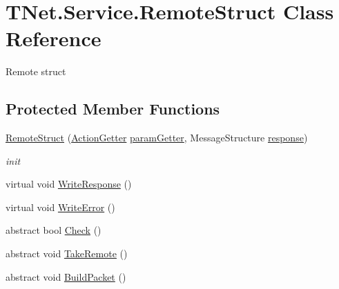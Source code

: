 \hypertarget{class_t_net_1_1_service_1_1_remote_struct}{}\section{T\+Net.\+Service.\+Remote\+Struct Class Reference}
\label{class_t_net_1_1_service_1_1_remote_struct}


Remote struct  


\subsection*{Protected Member Functions}
\begin{DoxyCompactItemize}
\item 
\mbox{\hyperlink{class_t_net_1_1_service_1_1_remote_struct_a8a7dc68ea6f1c71c7c59c099c981fede}{Remote\+Struct}} (\mbox{\hyperlink{class_t_net_1_1_service_1_1_action_getter}{Action\+Getter}} \mbox{\hyperlink{class_t_net_1_1_service_1_1_remote_struct_aa28ecde1dab94de21f6da421afbafc4c}{param\+Getter}}, Message\+Structure \mbox{\hyperlink{class_t_net_1_1_service_1_1_remote_struct_a1759bb0f1f894a8bcd48d8277330d57e}{response}})
\begin{DoxyCompactList}\small\item\em init \end{DoxyCompactList}\item 
virtual void \mbox{\hyperlink{class_t_net_1_1_service_1_1_remote_struct_ad7a02002079c9d56c4f8fa3dbc16b023}{Write\+Response}} ()
\item 
virtual void \mbox{\hyperlink{class_t_net_1_1_service_1_1_remote_struct_ab9233749a42d8131f7024a08ddb9a352}{Write\+Error}} ()
\item 
abstract bool \mbox{\hyperlink{class_t_net_1_1_service_1_1_remote_struct_a928f5ff2f97d1ec5ad88160befa91941}{Check}} ()
\item 
abstract void \mbox{\hyperlink{class_t_net_1_1_service_1_1_remote_struct_afa351a99bae78b432260517bc78401dc}{Take\+Remote}} ()
\item 
abstract void \mbox{\hyperlink{class_t_net_1_1_service_1_1_remote_struct_ae136ebdadcbb19579175014053f56651}{Build\+Packet}} ()
\end{DoxyCompactItemize}
